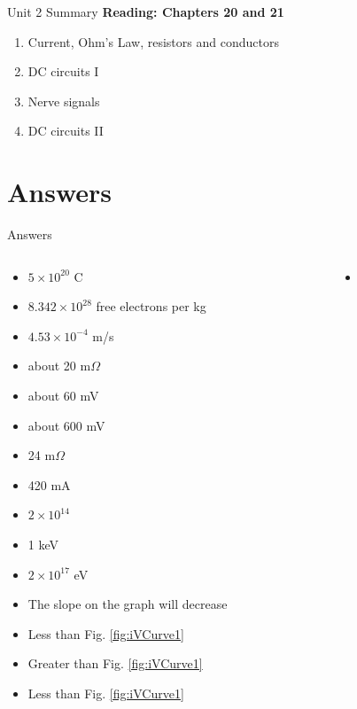 \documentclass{beamer}
\begin{document}
\begin{frame}{Unit 2 Summary}
\textbf{Reading: Chapters 20 and 21}
\begin{enumerate}
\item Current, Ohm's Law, resistors and conductors
\item DC circuits I
\item Nerve signals
\item \alert{DC circuits II}
\end{enumerate}
\end{frame}

\section{Answers}

\begin{frame}{Answers}
\tiny
\begin{columns}[T]
\begin{column}{0.5\textwidth}
\begin{itemize}
\item $5 \times 10^{20}$ C
\item $8.342 \times 10^{28}$ free electrons per kg
\item $4.53 \times 10^{-4}$ m/s
\item about 20 m$\Omega$
\item about 60 mV
\item about 600 mV
\item 24 m$\Omega$
\item 420 mA
\item $2 \times 10^{14}$
\item 1 keV
\item $2 \times 10^{17}$ eV
\item The slope on the graph will decrease
\item Less than Fig. \ref{fig:iVCurve1}
\item Greater than Fig. \ref{fig:iVCurve1}
\item Less than Fig. \ref{fig:iVCurve1}
\end{itemize}
\end{column}
\begin{column}{0.5\textwidth}
\begin{itemize}
\item 
\end{itemize}
\end{column}
\end{columns}
\end{frame}
\end{document}
